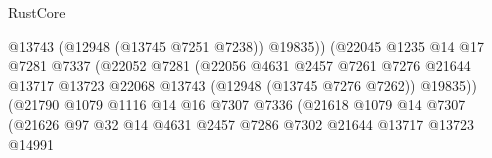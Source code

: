 \begin{lexlean}{RustCore}
\begin{coremodule}
                                                @13743
                                                (@12948 (@13745 @7251 @7238))
                                                @19835))
                                            (@22045
                                              @1235
                                              @14
                                              @17
                                              @7281
                                              @7337
                                              (@22052
                                                @7281
                                                (@22056
                                                  @4631
                                                  @2457
                                                  @7261
                                                  @7276
                                                  @21644
                                                  @13717
                                                  @13723
                                                  @22068
                                                  @13743
                                                  (@12948 (@13745 @7276 @7262))
                                                  @19835))
                                              (@21790
                                                @1079
                                                @1116
                                                @14
                                                @16
                                                @7307
                                                @7336
                                                (@21618
                                                  @1079
                                                  @14
                                                  @7307
                                                  (@21626
                                                    @97
                                                    @32
                                                    @14
                                                    @4631
                                                    @2457
                                                    @7286
                                                    @7302
                                                    @21644
                                                    @13717
                                                    @13723
                                                    @14991

\end{coremodule}
\end{lexlean}
